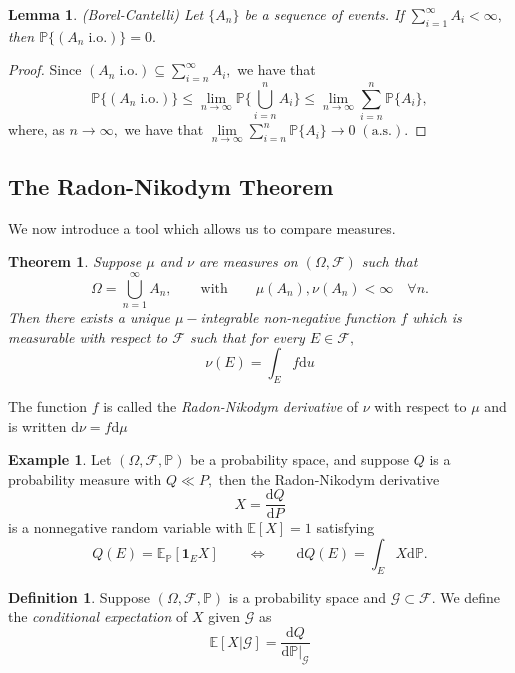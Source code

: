 \documentclass[openany, amssymb, psamsfonts]{amsart}
\newtheorem{thm}{Theorem}[section]
\newtheorem{lem}{Lemma}[section]
\theoremstyle{definition}
\newtheorem{defn}{Definition}[section]
\newtheorem{exmp}{Example}[section]
\numberwithin{equation}{section}
\newcommand{\bbE}{\mathbb{E}}
\newcommand{\bbP}{\mathbb{P}}
\newcommand{\dd}{\mathrm{d}}
\begin{document}
\begin{lem}
(Borel-Cantelli)
Let $\{A_n\}$ be a sequence of events. If $\displaystyle\sum_{i=1}^\infty A_i<\infty,$ then $\bbP\{(A_n \; \text{i.o.})\} = 0.$
\end{lem}

\begin{proof}
Since $(A_n \; \text{i.o.}) \subseteq \displaystyle\sum_{i=n}^\infty A_i,$ we have that
\[\bbP\{(A_n \; \text{i.o.})\} \leq \lim\limits_{n\to \infty}\bbP\{\bigcup_{i=n}^n A_i\}\leq \lim\limits_{n\to \infty}\sum_{i=n}^n \bbP\{A_i\},\] where, as $n\to \infty,$ we have that $\displaystyle\lim\limits_{n\to \infty}\displaystyle\sum_{i=n}^n \bbP\{A_i\}\to 0 \; (\text{a.s.}).$
\end{proof}




\subsection{The Radon-Nikodym Theorem} %
We now introduce a tool which allows us to compare measures.  
\begin{thm}
Suppose $\mu$ and $\nu$ are measures on $(\Omega, \mathcal{F})$ such that
\[\Omega = \bigcup_{n=1}^\infty A_n, \qquad \text{with} \qquad \mu(A_n), \nu(A_n) < \infty \quad \forall n.\] Then there exists a unique $\mu-$integrable non-negative function $f$ which is measurable with respect to $\mathcal{F}$ such that for every $E\in \mathcal{F},$
\[\nu(E) = \int_E f\mathrm{d}u\]
\end{thm}

The function $f$ is called the \textit{Radon-Nikodym derivative} of $\nu$ with respect to $\mu$ and is written $\mathrm{d}\nu = f\mathrm{d}\mu$

\begin{exmp}%
Let $(\Omega, \mathcal{F}, \bbP)$ be a probability space, and suppose $Q$ is a probability measure with $Q\ll P,$ then the Radon-Nikodym derivative 
\[X = \frac{\dd Q}{\dd P}\]
is a nonnegative random variable with $\bbE[X] =1$ satisfying 
\[Q(E) = \bbE_\bbP[ \textbf{1}_E X] \qquad \Leftrightarrow \qquad \dd Q(E) = \int_E X \dd \bbP.\]
\end{exmp}

\begin{defn} %
Suppose $(\Omega, \mathcal{F}, \bbP)$ is a probability space and $\mathcal{G}\subset \mathcal{F}.$ We define the \textit{conditional expectation} of $X$ given $\mathcal{G}$ as
\[\bbE[X | \mathcal{G}] =\frac{\dd Q}{\dd\bbP|_\mathcal{G}}\]
\end{defn}
\end{document}
